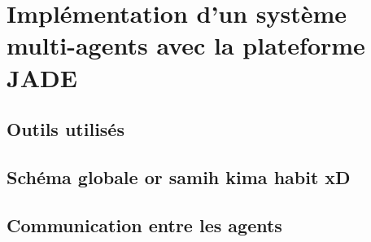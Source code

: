 \chapter{Implémentation d'un système multi-agents avec la plateforme JADE}
\section{Outils utilisés}
\section{Schéma globale or samih kima habit xD}
\section{Communication entre les agents}
